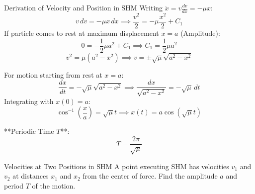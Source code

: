\documentclass[11pt,a4paper]{article}
\begin{document}
\begin{proofbox}{Derivation of Velocity and Position in SHM}
Writing $\ddot{x} = v \frac{dv}{dx} = -\mu x$:
\[
v \, dv = -\mu x \, dx \implies \frac{v^2}{2} = -\mu \frac{x^2}{2} + C_1
\]
If particle comes to rest at maximum displacement $x = a$ (Amplitude):
\[
0 = -\frac{1}{2}\mu a^2 + C_1 \implies C_1 = \frac{1}{2}\mu a^2
\]
\begin{equation}
v^2 = \mu (a^2 - x^2) \implies v = \pm \sqrt{\mu} \sqrt{a^2 - x^2}
\end{equation}

For motion starting from rest at $x = a$:
\[
\frac{dx}{dt} = -\sqrt{\mu} \sqrt{a^2 - x^2} \implies \frac{dx}{\sqrt{a^2 - x^2}} = -\sqrt{\mu} \, dt
\]
Integrating with $x(0) = a$:
\begin{equation}
\cos^{-1}\left(\frac{x}{a}\right) = \sqrt{\mu} t \implies x(t) = a \cos(\sqrt{\mu} t)
\end{equation}

**Periodic Time $T$**:
\begin{equation}
T = \frac{2\pi}{\sqrt{\mu}}
\end{equation}
\end{proofbox}

\begin{center}
\end{center}

\begin{examplebox}{Velocities at Two Positions in SHM}
A point executing SHM has velocities $v_1$ and $v_2$ at distances $x_1$ and $x_2$ from the center of force. Find the amplitude $a$ and period $T$ of the motion.
\end{examplebox}
\end{document}
